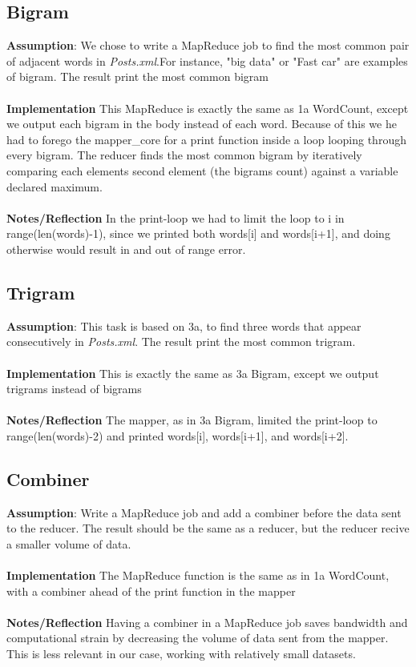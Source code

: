 \documentclass[fleqn,10pt]{wlscirep}
\begin{document}
\subsection{Bigram }
\textbf{Assumption}: We chose to write a MapReduce job to find the most common pair of adjacent words in \textit{Posts.xml}.For instance, "big data" or "Fast car" are examples of bigram. The result print the most common bigram   \\\\
\textbf{Implementation} This MapReduce is exactly the same as 1a WordCount, except we output each bigram in the body instead of each word. Because of this we he had to forego the mapper\_core for a print function inside a loop looping through every bigram. The reducer finds the most common bigram by iteratively comparing each elements second element (the bigrams count) against a variable declared maximum. \\ \\
\textbf{Notes/Reflection} In the print-loop we had to limit the loop to i in range(len(words)-1), since we printed both words[i] and words[i+1], and doing otherwise would result in and out of range error.


\subsection{Trigram}
\textbf{Assumption}: This task is based on 3a, to find three words that appear consecutively in \textit{Posts.xml}. The result print the most common trigram.  \\ \\
\textbf{Implementation} This is exactly the same as 3a Bigram, except we output trigrams instead of bigrams \\ \\
\textbf{Notes/Reflection} The mapper, as in 3a Bigram, limited the print-loop to range(len(words)-2) and printed words[i], words[i+1], and words[i+2].


\subsection{Combiner}
\textbf{Assumption}: Write a MapReduce job and add a combiner before  the data sent to the reducer. The result should be the same as a reducer, but the reducer recive a smaller volume of data.  \\ \\
\textbf{Implementation} The MapReduce function is the same as in 1a WordCount, with a combiner ahead of the print function in the mapper \\ \\
\textbf{Notes/Reflection} Having a combiner in a MapReduce job saves bandwidth and computational strain by decreasing the volume of data sent from the mapper. This is less relevant in our case, working with relatively small datasets.

\end{document}
